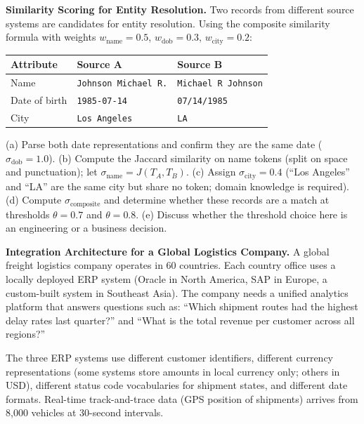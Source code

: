 \ap \textbf{Similarity Scoring for Entity Resolution.}
Two records from different source systems are candidates for entity
resolution. Using the composite similarity formula with weights
$w_\text{name} = 0.5$, $w_\text{dob} = 0.3$, $w_\text{city} = 0.2$:

\medskip
\noindent
\begin{tabular}{lll}
\toprule
\textbf{Attribute} & \textbf{Source A} & \textbf{Source B} \\
\midrule
Name      & \texttt{Johnson Michael R.} & \texttt{Michael R Johnson} \\
Date of birth & \texttt{1985-07-14} & \texttt{07/14/1985} \\
City      & \texttt{Los Angeles} & \texttt{LA} \\
\bottomrule
\end{tabular}

\medskip
\noindent
(a) Parse both date representations and confirm they are the same date
($\sigma_\text{dob} = 1.0$). (b) Compute the Jaccard similarity on
name tokens (split on space and punctuation); let
$\sigma_\text{name} = J(T_A, T_B)$. (c) Assign
$\sigma_\text{city} = 0.4$ (``Los Angeles'' and ``LA'' are the same
city but share no token; domain knowledge is required). (d) Compute
$\sigma_\text{composite}$ and determine whether these records are a
match at thresholds $\theta = 0.7$ and $\theta = 0.8$. (e) Discuss
whether the threshold choice here is an engineering or a business
decision.

\bigskip
{}

\dpr \textbf{Integration Architecture for a Global Logistics Company.}
A global freight logistics company operates in 60 countries. Each
country office uses a locally deployed ERP system (Oracle in North
America, SAP in Europe, a custom-built system in Southeast Asia). The
company needs a unified analytics platform that answers questions such
as: ``Which shipment routes had the highest delay rates last quarter?''
and ``What is the total revenue per customer across all regions?''

The three ERP systems use different customer identifiers, different
currency representations (some systems store amounts in local currency
only; others in USD), different status code vocabularies for shipment
states, and different date formats. Real-time track-and-trace data
(GPS position of shipments) arrives from 8,000 vehicles at 30-second
intervals.

